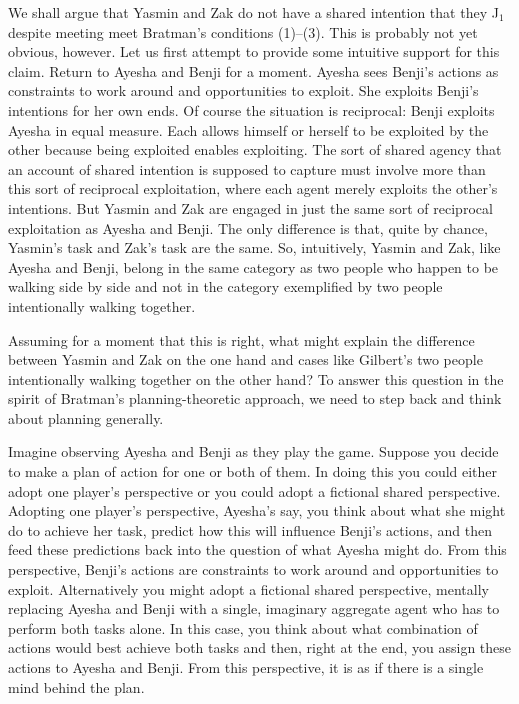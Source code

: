 \documentclass[12pt,\papersize]{extarticle}
\begin{document}
We shall argue that Yasmin and Zak do not have a shared intention that they J$_1$ despite meeting meet Bratman's conditions (1)--(3).
This is probably not yet obvious, however.
Let us first attempt to provide some intuitive support for this claim.
Return to Ayesha and Benji for a moment.
Ayesha sees Benji's actions as constraints to work around and opportunities to exploit.
She exploits Benji's intentions for her own ends.
Of course the situation is reciprocal: Benji exploits Ayesha in equal measure.
Each allows himself or herself to be exploited by the other because being exploited enables exploiting.
The sort of shared agency that an account of shared intention is supposed to capture must involve more than this sort of reciprocal exploitation, where each agent merely exploits the other's intentions. 
But Yasmin and Zak are engaged in just the same sort of reciprocal exploitation as Ayesha and Benji.
The only difference is that, quite by chance, Yasmin's task and Zak's task are the same.
So, intuitively, Yasmin and Zak, like Ayesha and Benji, belong in the same category as two people who happen to be walking side by side and not in the category exemplified by two people intentionally walking together.

Assuming for a moment that this is right,
what might explain the difference between Yasmin and Zak on the one hand and cases like Gilbert's two people intentionally walking together on the other hand?
To answer this question in the spirit of Bratman's planning-theoretic approach, we need to step back and think about planning generally.

Imagine observing Ayesha and Benji as they play the game. 
Suppose you decide to make a plan of action for one or both of them.
In doing this you could either adopt one player's perspective or you could adopt a fictional shared perspective.
Adopting one player's perspective, Ayesha's say, 
	you think about what she might do to achieve her task,
	predict how this will influence Benji's actions,
	and then feed  these predictions back into the question of what Ayesha might do.
From this perspective, Benji's actions are constraints to work around and opportunities to exploit.
Alternatively you might adopt a fictional shared perspective, 
	 mentally replacing Ayesha and Benji with a single, imaginary aggregate agent who has to perform both tasks alone.
	 In this case, you think about what combination of actions would best achieve both tasks and then, right at the end, you assign these actions to Ayesha and Benji.
From this perspective, it is as if there is a single mind behind the plan.
\end{document}
